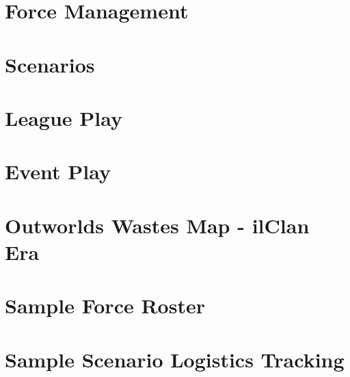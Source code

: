 \documentclass{article}
\newcommand{\sectiontitle}{}
\newcommand{\newsection}[2]{\renewcommand{\sectiontitle}{#2}\section{#1}}
\begin{document}


\newsection{Force Management}{force-management}



\newpage

\newsection{Scenarios}{scenarios}



\newpage

\newsection{League Play}{league-play}



\newpage

\newsection{Event Play}{event-play}



\newpage

\newsection{Outworlds Wastes Map - ilClan Era}{outworlds-wastes-map}



\newpage

\newsection{Sample Force Roster}{sample-force-roster}



\newpage

\newsection{Sample Scenario Logistics Tracking}{sample-logistics}
\end{document}
